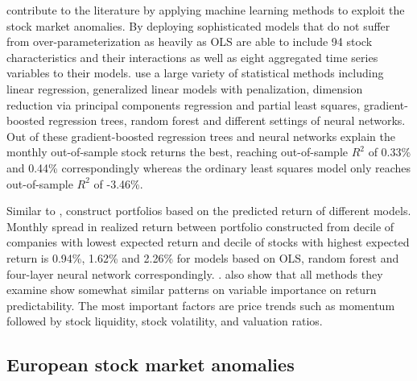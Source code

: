 \documentclass[12pt]{article}
\begin{document}
\citet{guetal} contribute to the literature by applying machine learning methods to exploit the stock market anomalies. By deploying sophisticated models that do not suffer from over-parameterization as heavily as OLS \citeauthor{guetal} are able to include 94 stock characteristics and their interactions as well as eight aggregated time series variables to their models.\footnotemark {} \citeauthor{guetal} use a large variety of statistical methods including linear regression, generalized linear models with penalization, dimension reduction via principal components regression and partial least squares, gradient-boosted regression trees, random forest and different settings of neural networks.\footnotemark {} \citeauthor{guetal} Out of these gradient-boosted regression trees and neural networks explain the monthly out-of-sample stock returns the best, reaching out-of-sample $R^{2}$ of 0.33\% and 0.44\% correspondingly whereas the ordinary least squares model only reaches out-of-sample $R^{2}$ of -3.46\%.\footnotemark {} \par

Similar to \citet{Lewellen2015}, \citeauthor{guetal} construct portfolios based on the predicted return of different models. Monthly spread in realized return between portfolio constructed from decile of companies with lowest expected return and decile of stocks with highest expected return is 0.94\%, 1.62\% and 2.26\% for models based on OLS, random forest and four-layer neural network correspondingly. \footnotemark {}. \citeauthor{guetal} also show that all methods they examine show somewhat similar patterns on variable importance on return predictability. The most important factors are price trends such as momentum followed by stock liquidity, stock volatility, and valuation ratios.\footnotemark {} \par

\subsection{European stock market anomalies}\label{EuropeanStockMarketAnomalies}
\end{document}
